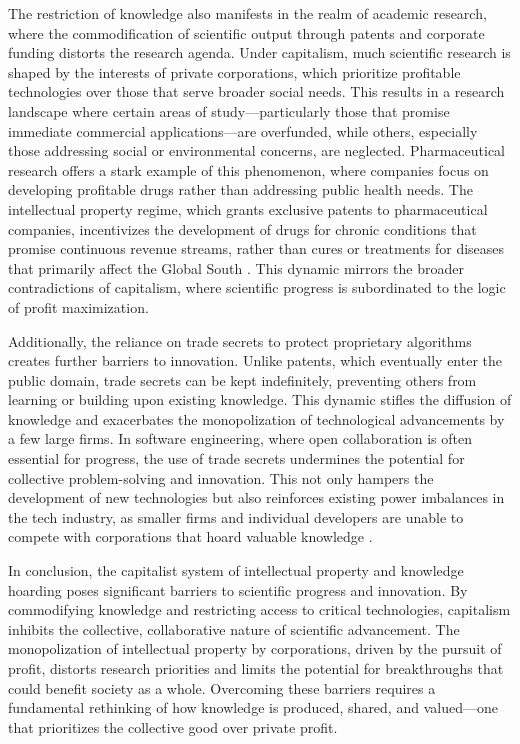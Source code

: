 The restriction of knowledge also manifests in the realm of academic research, where the commodification of scientific output through patents and corporate funding distorts the research agenda. Under capitalism, much scientific research is shaped by the interests of private corporations, which prioritize profitable technologies over those that serve broader social needs. This results in a research landscape where certain areas of study—particularly those that promise immediate commercial applications—are overfunded, while others, especially those addressing social or environmental concerns, are neglected. Pharmaceutical research offers a stark example of this phenomenon, where companies focus on developing profitable drugs rather than addressing public health needs. The intellectual property regime, which grants exclusive patents to pharmaceutical companies, incentivizes the development of drugs for chronic conditions that promise continuous revenue streams, rather than cures or treatments for diseases that primarily affect the Global South \cite[pp.~45-47]{angell2004}. This dynamic mirrors the broader contradictions of capitalism, where scientific progress is subordinated to the logic of profit maximization.

Additionally, the reliance on trade secrets to protect proprietary algorithms creates further barriers to innovation. Unlike patents, which eventually enter the public domain, trade secrets can be kept indefinitely, preventing others from learning or building upon existing knowledge. This dynamic stifles the diffusion of knowledge and exacerbates the monopolization of technological advancements by a few large firms. In software engineering, where open collaboration is often essential for progress, the use of trade secrets undermines the potential for collective problem-solving and innovation. This not only hampers the development of new technologies but also reinforces existing power imbalances in the tech industry, as smaller firms and individual developers are unable to compete with corporations that hoard valuable knowledge \cite[pp.~76-79]{mazzucato2018}.

In conclusion, the capitalist system of intellectual property and knowledge hoarding poses significant barriers to scientific progress and innovation. By commodifying knowledge and restricting access to critical technologies, capitalism inhibits the collective, collaborative nature of scientific advancement. The monopolization of intellectual property by corporations, driven by the pursuit of profit, distorts research priorities and limits the potential for breakthroughs that could benefit society as a whole. Overcoming these barriers requires a fundamental rethinking of how knowledge is produced, shared, and valued—one that prioritizes the collective good over private profit.

